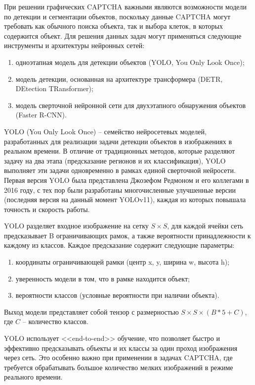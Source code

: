 При решении графических CAPTCHA важными являются возможности модели по детекции
и сегментации объектов, поскольку данные CAPTCHA могут требовать как обычного 
поиска объекта, так и выбора клеток, в которых содержится объект. Для решения 
данных задач могут применяться следующие инструменты и архитектуры нейронных 
сетей:

\begin{enumerate}
    \item одноэтапная модель для детекции объектов (YOLO, You Only Look Once);
    \item модель детекции, основанная на архитектуре трансформера (DETR, 
    DEtection TRansformer);
    \item модель сверточной нейронной сети для двухэтапного обнаружения объектов 
    (Faster R-CNN).
\end{enumerate}

YOLO (You Only Look Once) -- семейство нейросетевых моделей, разработанных для 
реализации задачи детекции объектов в изображениях в реальном времени. В отличие 
от традиционных методов, которые разделяют задачу на два этапа (предсказание 
регионов и их классификация), YOLO выполняет эти задачи одновременно в рамках 
единой сверточной нейросети. Первая версия YOLO была представлена Джозефом 
Редмоном и его коллегами в 2016 году, с тех пор были разработаны многочисленные 
улучшенные версии (последняя версия на данный момент YOLOv11), каждая из которых 
повышала точность и скорость работы.

YOLO разделяет входное изображение на сетку $S \times S$, для каждой ячейки сеть 
предсказывает B ограничивающих рамок, а также вероятности принадлежности к 
каждому из классов. Каждое предсказание содержит следующие параметры:

\begin{enumerate}
    \item координаты ограничивающей рамки (центр x, y, ширина w, высота h);
    \item уверенность модели в том, что в рамке находится объект;
    \item вероятности классов (условные вероятности при наличии объекта).
\end{enumerate}

Выход модели представляет собой тензор с размерностью $S \times S \times (B * 5 + 
C)$, где $C$ -- количество классов.

YOLO использует <<end-to-end>> обучение, что позволяет быстро и эффективно 
предсказывать объекты и их классы за один проход изображения через сеть. Это 
особенно важно при применении в задачах CAPTCHA, где требуется обрабатывать 
большое количество мелких изображений в режиме реального времени.

